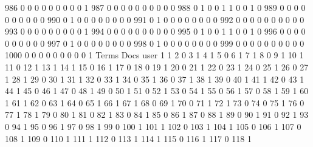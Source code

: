 \documentclass[compress,8pt]{beamer}
\begin{document}
\begin{frame}
\begin{Schunk}
  986      0       0   0              0        0    0       0       0   0   1
  987      0       0   0              0        0    0       0       0   0   0
  988      0       1   0              0        1    1       0       0   1   0
  989      0       0   0              0        0    0       0       0   0   0
  990      0       1   0              0        0    0       0       0   0   0
  991      0       1   0              0        0    0       0       0   0   0
  992      0       0   0              0        0    0       0       0   0   0
  993      0       0   0              0        0    0       0       0   0   1
  994      0       0   0              0        0    0       0       0   0   0
  995      0       1   0              0        1    1       0       0   1   0
  996      0       0   0              0        0    0       0       0   0   0
  997      0       1   0              0        0    0       0       0   0   0
  998      0       1   0              0        0    0       0       0   0   0
  999      0       0   0              0        0    0       0       0   0   0
  1000     0       0   0              0        0    0       0       0   0   1
      Terms
Docs   user
  1       1
  2       0
  3       1
  4       1
  5       0
  6       1
  7       1
  8       0
  9       1
  10      1
  11      0
  12      1
  13      1
  14      1
  15      0
  16      1
  17      0
  18      0
  19      1
  20      0
  21      1
  22      0
  23      1
  24      0
  25      1
  26      0
  27      1
  28      1
  29      0
  30      1
  31      1
  32      0
  33      1
  34      0
  35      1
  36      0
  37      1
  38      1
  39      0
  40      1
  41      1
  42      0
  43      1
  44      1
  45      0
  46      1
  47      0
  48      1
  49      0
  50      1
  51      0
  52      1
  53      0
  54      1
  55      0
  56      1
  57      0
  58      1
  59      1
  60      1
  61      1
  62      0
  63      1
  64      0
  65      1
  66      1
  67      1
  68      0
  69      1
  70      0
  71      1
  72      1
  73      0
  74      0
  75      1
  76      0
  77      1
  78      1
  79      0
  80      1
  81      0
  82      1
  83      0
  84      1
  85      0
  86      1
  87      0
  88      1
  89      0
  90      1
  91      0
  92      1
  93      0
  94      1
  95      0
  96      1
  97      0
  98      1
  99      0
  100     1
  101     1
  102     0
  103     1
  104     1
  105     0
  106     1
  107     0
  108     1
  109     0
  110     1
  111     1
  112     0
  113     1
  114     1
  115     0
  116     1
  117     0
  118     1

\end{Schunk}
\end{frame}
\end{document}
